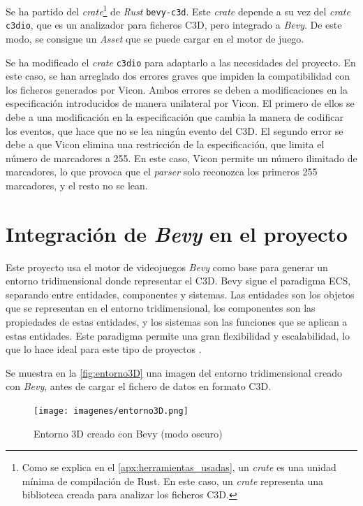 Se ha partido del \textit{crate}\footnote{Como se explica en el \autoref{apx:herramientas_usadas}, un \textit{crate} es una unidad mínima de compilación de Rust. En este caso, un \textit{crate} representa una biblioteca creada para analizar los ficheros \ac{C3D}.} de \textit{Rust} \texttt{bevy-c3d}. Este \textit{crate} depende a su vez del \textit{crate} \texttt{c3dio}, que es un analizador para ficheros \ac{C3D}, pero integrado a \textit{Bevy}. De este modo, se consigue un \textit{Asset} que se puede cargar en el motor de juego.

Se ha modificado el \textit{crate} \texttt{c3dio} para adaptarlo a las necesidades del proyecto. En este caso, se han arreglado dos errores graves que impiden la compatibilidad con los ficheros generados por Vicon. Ambos errores se deben a modificaciones en la especificación introducidos de manera unilateral por Vicon. El primero de ellos se debe a una modificación en la especificación que cambia la manera de codificar los eventos, que hace que no se lea ningún evento del \ac{C3D}. El segundo error se debe a que Vicon elimina una restricción de la especificación, que limita el número de marcadores a 255. En este caso, Vicon permite un número ilimitado de marcadores, lo que provoca que el \textit{parser} solo reconozca los primeros 255 marcadores, y el resto no se lean.   

\section{Integración de \textit{Bevy} en el proyecto} \label{sec:bevy}

Este proyecto usa el motor de videojuegos \textit{Bevy} como base para generar un entorno tridimensional donde representar el \ac{C3D}. Bevy sigue el paradigma \ac{ECS}, separando entre entidades, componentes y sistemas. Las entidades son los objetos que se representan en el entorno tridimensional, los componentes son las propiedades de estas entidades, y los sistemas son las funciones que se aplican a estas entidades. Este paradigma permite una gran flexibilidad y escalabilidad, lo que lo hace ideal para este tipo de proyectos \autocite{prdevingDeepdivingEntityComponent2023}.

Se muestra en la \autoref{fig:entorno3D} una imagen del entorno tridimensional creado con \textit{Bevy}, antes de cargar el fichero de datos en formato \ac{C3D}.


\begin{figure}[H]
  \centering
  \texttt{[image: imagenes/entorno3D.png]}
  \caption{Entorno 3D creado con Bevy (modo oscuro)}
  \label{fig:entorno3D}
\end{figure}

